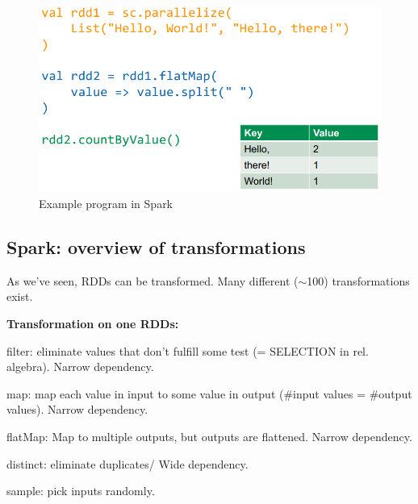 \documentclass[11pt,oneside,a4paper]{article}
\begin{document}
\begin{figure}[hb!]
	\centering
	\includegraphics[width=0.25\linewidth]{figures/spark_hello_world}
	\caption{Example program in Spark}
	\label{fig:sparkhelloworld}
\end{figure}


\subsection{Spark: overview of transformations}

As we've seen, RDDs can be transformed. Many different ($\sim$100) transformations exist.

\textbf{Transformation on one RDDs:}
\begin{compactitem}
\item filter: eliminate values that don't fulfill some test (= SELECTION in rel. algebra). Narrow dependency.
\item map: map each value in input to some value in output (\#input values = \#output values). Narrow dependency.
\item flatMap: Map to multiple outputs, but outputs are flattened. Narrow dependency.
\item distinct: eliminate duplicates/ Wide dependency.
\item sample: pick inputs randomly.
\end{compactitem}
\end{document}
